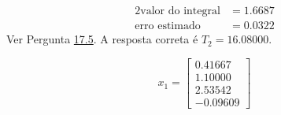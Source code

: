 \documentclass{mnum}
\begin{document}
%
\begin{alignat*}{2}
	\text{valor do integral} &= 1.6687\\
	\text{erro estimado}     &= 0.0322
\end{alignat*}
Ver Pergunta \hyperref[ssec:17_5]{17.5}.
%
A resposta correta é $T_2=16.08000$.

%
\begin{equation*}
	x_1 = \begin{bmatrix}
		0.41667\\
		1.10000\\
		2.53542\\
		-0.09609
	\end{bmatrix}
\end{equation*}
\end{document}
